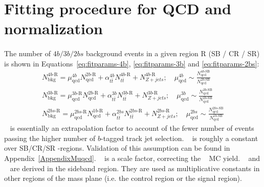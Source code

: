 \section{Fitting procedure for QCD and \ttbar~ normalization}
\label{sec:ttbarnorm}

\paragraph{}
The number of $4b/3b/2bs$ background events in a given region R (SB / CR / SR) is shown in Equations~\ref{eq:fitparams-4b}, \ref{eq:fitparams-3b} and \ref{eq:fitparams-2bs}:
\begin{eqnarray}
\label{eq:fitparams-4b}
N^{4b\text{-R}}_{\text{bkg}} = \mu_{\text{qcd}}^{4b} N^{2b\text{-R}}_{\text{qcd}} + \alpha_{t\bar{t}}^{4b} N^{4b\text{-R}}_{t\bar{t}} + N^{4b\text{-R}}_{Z+jets};
\quad \mu_{\text{qcd}}^{4b} \sim \frac{N^{4b\text{-SB}}_{\text{qcd}}}{N^{2b\text{-SB}}_{\text{qcd}}}
\\
\label{eq:fitparams-3b}
N^{3b\text{-R}}_{\text{bkg}} = \mu_{\text{qcd}}^{3b\text{-R}} N^{2b\text{-R}}_{\text{qcd}} + \alpha_{t\bar{t}}^{3b} N^{3b\text{-R}}_{t\bar{t}} + N^{3b\text{-R}}_{Z+jets} ;
\quad \mu_{\text{qcd}}^{3b} \sim \frac{N^{3b\text{-SB}}_{\text{qcd}}}{N^{2b\text{-SB}}_{\text{qcd}}}\\
\label{eq:fitparams-2bs}
N^{2bs\text{-R}}_{\text{bkg}} = \mu_{\text{qcd}}^{2bs\text{-R}} N^{1b\text{-R}}_{\text{qcd}} + \alpha_{t\bar{t}}^{2bs} N^{2bs\text{-R}}_{t\bar{t}} + N^{2bs\text{-R}}_{Z+jets};
\quad \mu_{\text{qcd}}^{2bs} \sim \frac{N^{2bs\text{-SB}}_{\text{qcd}}}{N^{1b\text{-SB}}_{\text{qcd}}}
\end{eqnarray} 
\muqcd~ is essentially an extrapolation factor to account of the fewer number of events passing the higher number of $b$-tagged track jet selection.
\muqcd~ is roughly a constant over SB/CR/SR \mleadJ-\msublJ regions.
Validation of this assumption can be found in Appendix~\ref{AppendixMuqcd}.
\alphatt~ is a scale factor, correcting the \ttbar~ MC yield.
\muqcd~ and \alphatt~ are derived in the sideband region.
They are used as multiplicative constants in other regions of the mass plane (i.e. the control region or the signal region).

